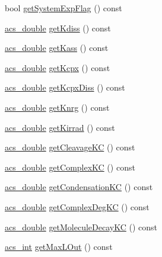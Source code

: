 \begin{DoxyCompactItemize}
\item 
bool \hyperlink{classenvironment_a883327bbb969164eb8b3c2d1c941ca03}{get\-System\-Exp\-Flag} () const 
\item 
\hyperlink{acs__headers_8h_ab776853a005fcbf56af0424a2a4dd607}{acs\-\_\-double} \hyperlink{classenvironment_ab429d2057ee1092bf210c29e70153f75}{get\-Kdiss} () const 
\item 
\hyperlink{acs__headers_8h_ab776853a005fcbf56af0424a2a4dd607}{acs\-\_\-double} \hyperlink{classenvironment_aa862f1f98c6060747d6f1f30377671ff}{get\-Kass} () const 
\item 
\hyperlink{acs__headers_8h_ab776853a005fcbf56af0424a2a4dd607}{acs\-\_\-double} \hyperlink{classenvironment_ac62c6b719db59d5829e3cc451b237f44}{get\-Kcpx} () const 
\item 
\hyperlink{acs__headers_8h_ab776853a005fcbf56af0424a2a4dd607}{acs\-\_\-double} \hyperlink{classenvironment_a9091c4a0fe31f6d5f5330e7ebff297a3}{get\-Kcpx\-Diss} () const 
\item 
\hyperlink{acs__headers_8h_ab776853a005fcbf56af0424a2a4dd607}{acs\-\_\-double} \hyperlink{classenvironment_a7615c746521a592ff1ab2d0793b14d89}{get\-Knrg} () const 
\item 
\hyperlink{acs__headers_8h_ab776853a005fcbf56af0424a2a4dd607}{acs\-\_\-double} \hyperlink{classenvironment_a4c163b36e84cd8406aff4ab5d220a251}{get\-Kirrad} () const 
\item 
\hyperlink{acs__headers_8h_ab776853a005fcbf56af0424a2a4dd607}{acs\-\_\-double} \hyperlink{classenvironment_a771963196a27d3532cd7af4b98a5a9c5}{get\-Cleavage\-K\-C} () const 
\item 
\hyperlink{acs__headers_8h_ab776853a005fcbf56af0424a2a4dd607}{acs\-\_\-double} \hyperlink{classenvironment_abf3168adf05ff9fa6bab4e34b387f0a6}{get\-Complex\-K\-C} () const 
\item 
\hyperlink{acs__headers_8h_ab776853a005fcbf56af0424a2a4dd607}{acs\-\_\-double} \hyperlink{classenvironment_a7ac1b69dd38107d5c40339563969d09f}{get\-Condensation\-K\-C} () const 
\item 
\hyperlink{acs__headers_8h_ab776853a005fcbf56af0424a2a4dd607}{acs\-\_\-double} \hyperlink{classenvironment_ae58bcd60ae01a8ba12f83c1328121c35}{get\-Complex\-Deg\-K\-C} () const 
\item 
\hyperlink{acs__headers_8h_ab776853a005fcbf56af0424a2a4dd607}{acs\-\_\-double} \hyperlink{classenvironment_a4ed6ad35297e718398fb42a2b9dbe4ae}{get\-Molecule\-Decay\-K\-C} () const 
\item 
\hyperlink{acs__headers_8h_a8d277355641a098190360234e2ebde35}{acs\-\_\-int} \hyperlink{classenvironment_a4c58b3ce555f04f009bcfb7bbc2b0000}{get\-Max\-L\-Out} () const 

\end{DoxyCompactItemize}
